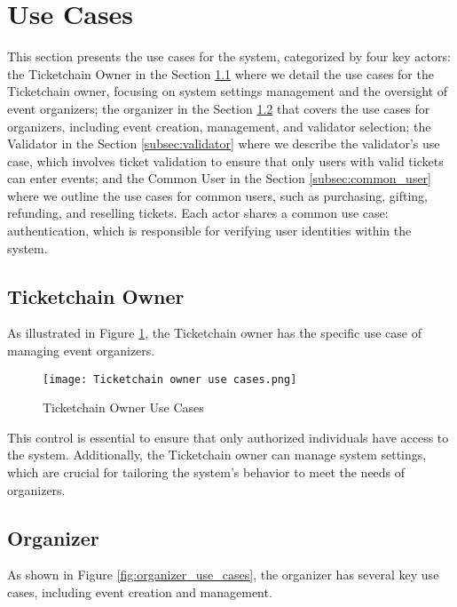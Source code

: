 \section{Use Cases}
\label{sec:use_cases}

This section presents the use cases for the system, categorized by four key
actors: the Ticketchain Owner in the Section \ref{subsec:ticketchain_owner}
where we detail the use cases for the Ticketchain owner, focusing on system
settings management and the oversight of event organizers; the organizer in the
Section \ref{subsec:organizer} that covers the use cases for organizers,
including event creation, management, and validator selection; the Validator in
the Section \ref{subsec:validator} where we describe the validator's use case,
which involves ticket validation to ensure that only users with valid tickets
can enter events; and the Common User in the Section \ref{subsec:common_user}
where we outline the use cases for common users, such as purchasing, gifting,
refunding, and reselling tickets. Each actor shares a common use case:
authentication, which is responsible for verifying user identities within the
system.

\subsection{Ticketchain Owner}
\label{subsec:ticketchain_owner}

As illustrated in Figure \ref{fig:ticketchain_owner_use_cases}, the Ticketchain
owner has the specific use case of managing event organizers.

\begin{figure}[H]
    \centering
    \texttt{[image: Ticketchain owner use cases.png]}
    \caption{Ticketchain Owner Use Cases}
    \label{fig:ticketchain_owner_use_cases}
\end{figure}

This control is essential to ensure that only authorized individuals have
access to the system. Additionally, the Ticketchain owner can manage system
settings, which are crucial for tailoring the system’s behavior to meet the
needs of organizers.

\subsection{Organizer}
\label{subsec:organizer}

As shown in Figure \ref{fig:organizer_use_cases}, the organizer has several key
use cases, including event creation and management.

